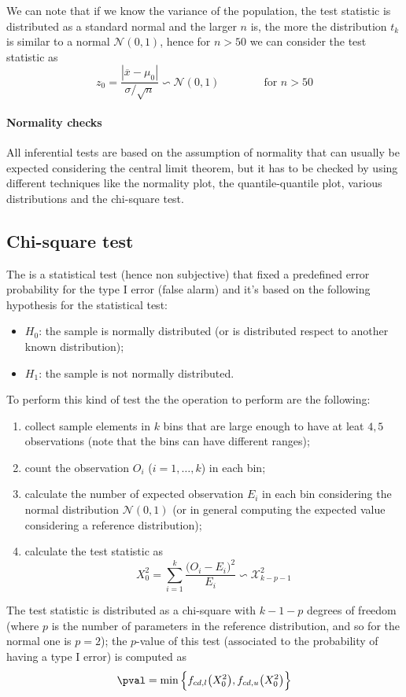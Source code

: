 	We can note that if we know the variance of the population, the test statistic is distributed as a standard normal and the larger $n$ is, the more the distribution $t_k$ is similar to a normal $\mathcal N(0,1)$, hence for $n>50$ we can consider the test statistic as
	\[ z_0 = \frac{|\overline x-\mu_0|}{\sigma/\sqrt n} \backsim \mathcal N(0,1) \qquad \qquad \textrm{for } n >50 \] 
	
	\paragraph{Normality checks} All inferential tests are based on the assumption of normality that can usually be expected considering the central limit theorem, but it has to be checked by using different techniques like the normality plot, the quantile-quantile plot, various distributions and the chi-square test.
			
\subsection{Chi-square test}
	
	The  is a statistical test (hence non subjective) that fixed a predefined error probability for the type I error (false alarm) and it's based on the following hypothesis for the statistical test:
	\begin{itemize}
		\item $H_0$: the sample is normally distributed (or is distributed respect to another known distribution);
		\item $H_1$: the sample is not normally distributed.
	\end{itemize}
	
	To perform this kind of test the the operation to perform are the following:
	\begin{enumerate}
		\item collect sample elements in $k$ bins that are large enough to have at leat $4,5$ observations (note that the bins can have different ranges);
		\item count the observation $O_i$ ($i=1,\dots,k$) in each bin;
		\item calculate the number of expected observation $E_i$ in each bin considering the normal distribution $\mathcal N(0,1)$ (or in general computing the expected value considering  a reference distribution);
		\item calculate the test statistic as
		\begin{equation}
			X_0^2  = \sum_{i=1}^k \frac{\big(O_i-E_i\big)^2}{E_i} \backsim \mathcal X_{k-p-1}^2
		\end{equation}
	\end{enumerate}
	The test statistic is distributed as a chi-square with $k-1-p$ degrees of freedom (where $p$ is the number of parameters in the reference distribution, and so for the normal one is $p=2$); the $p$-value of this test (associated to the probability of having a type I error) is computed as
	\begin{equation}
		\pval = \min \Big\{ f_{cd,l}\big(X_0^2\big), f_{cd,u}\big(X_0^2\big) \Big\}
	\end{equation}
	
